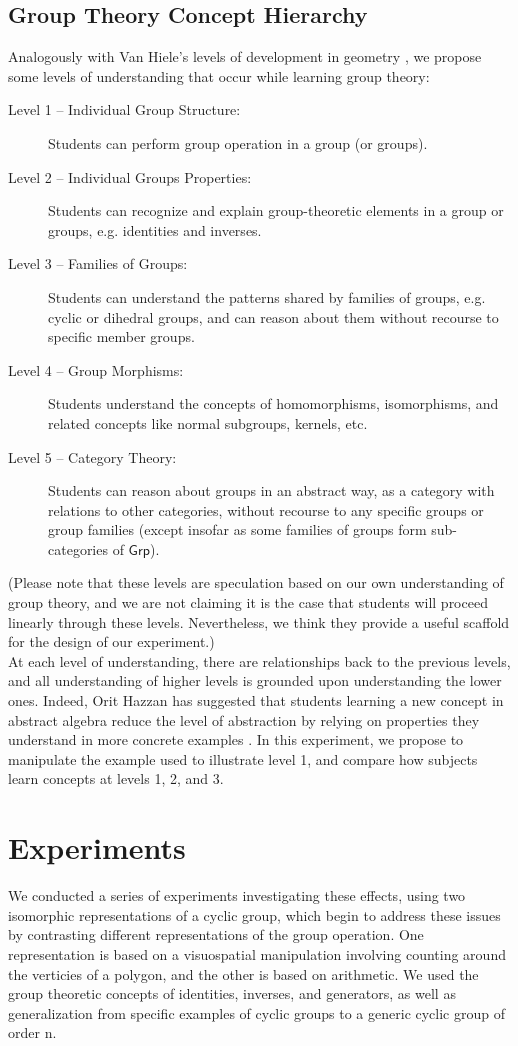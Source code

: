 \documentclass[11pt]{article}
\begin{document}
\subsection{Group Theory Concept Hierarchy}
Analogously with Van Hiele's levels of development in geometry \cite{Burger1986}, we propose some levels of understanding that occur while learning group theory:
\begin{description}
\item[Level 1 -- Individual Group Structure:] Students can perform group operation in a group (or groups).
\item[Level 2 -- Individual Groups Properties:] Students can recognize and explain group-theoretic elements in a group or groups, e.g. identities and inverses.
\item[Level 3 -- Families of Groups:] Students can understand the patterns shared by families of groups, e.g. cyclic or dihedral groups, and can reason about them without recourse to specific member groups.
\item[Level 4 -- Group Morphisms:] Students understand the concepts of homomorphisms, isomorphisms, and related concepts like normal subgroups, kernels, etc.
\item[Level 5 -- Category Theory:] Students can reason about groups in an abstract way, as a category with relations to other categories, without recourse to any specific groups or group families (except insofar as some families of groups form sub-categories of $\mathsf{Grp}$).
\end{description}
(Please note that these levels are speculation based on our own understanding of group theory, and we are not claiming it is the case that students will proceed linearly through these levels. Nevertheless, we think they provide a useful scaffold for the design of our experiment.) \\[11pt]
At each level of understanding, there are relationships back to the previous levels, and all understanding of higher levels is grounded upon understanding the lower ones. Indeed, Orit Hazzan has suggested that students learning a new concept in abstract algebra reduce the level of abstraction by relying on properties they understand in more concrete examples \cite{Hazzan1999}. In this experiment, we propose to manipulate the example used to illustrate level 1, and compare how subjects learn concepts at levels 1, 2, and 3.
 
\section{Experiments}
We conducted a series of experiments investigating these effects, using two isomorphic representations of a cyclic group, which begin to address these issues by contrasting different representations of the group operation. One representation is based on a visuospatial manipulation involving counting around the verticies of a polygon, and the other is based on arithmetic. We used the group theoretic concepts of identities, inverses, and generators, as well as generalization from specific examples of cyclic groups to a generic cyclic group of order n. 
\end{document}
